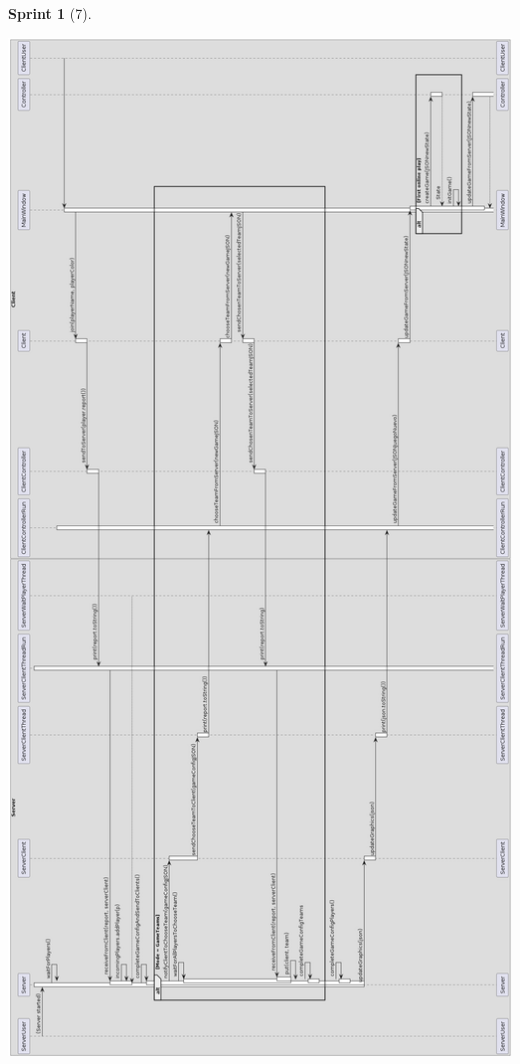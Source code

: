 \documentclass[12pt,a4paper,openright]{book}
\theoremstyle{break}
\newtheorem*{sprint}{Sprint}
\begin{document}
\begin{sprint}[7]
\begin{center}
\includegraphics[scale=0.3]{empezarPartidaUmlSprint7.png}
\end{center}



\end{sprint}
\end{document}
